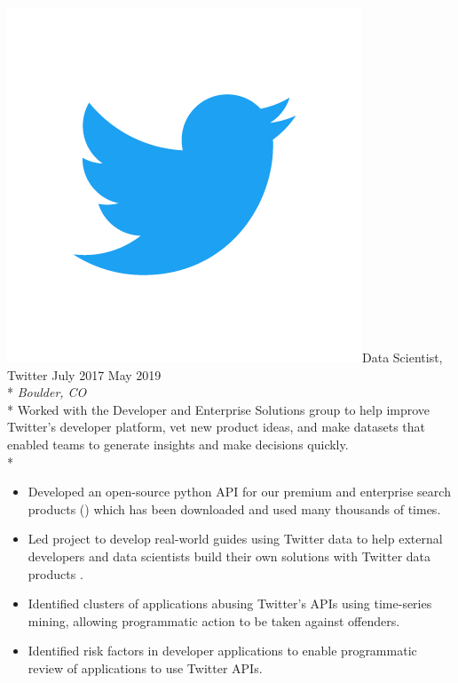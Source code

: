 \documentclass[print]{friggeri-cv} %
\newcommand{\twittericon}{\includegraphics[scale=0.05]{Twitter_Logo_Blue.png}}%
\begin{document}
\begin{description} \itemsep1pt \parskip0pt 
  \item \twittericon {\largeheaderfont Data Scientist, Twitter } \hfill
    {\smallheaderfont July 2017 \textemdash  May 2019}\\*
    {\footnotesize \emph{Boulder, CO}} \\*
    Worked with the Developer and Enterprise Solutions group to help improve
    Twitter's developer platform, vet new product ideas, and make datasets that
    enabled teams to generate insights and make decisions quickly.\\*
    \begin{itemize} \itemsep0.5pt \parskip0pt 
      \item Developed an open-source python API for our premium and enterprise search
          products (\cite{search_tweets_python}) which has been downloaded and used 
          many thousands of times.

      \item Led project to develop real-world guides using Twitter data to
      help external developers and data scientists build their own solutions
      with Twitter data products \cite{do_more_with_twtter_data}.

      \item Identified clusters of applications abusing Twitter's APIs using time-series mining, allowing
      programmatic action to be taken against offenders.

      \item Identified risk factors in developer applications to enable programmatic
            review of applications to use Twitter APIs.

    \end{itemize}
\end{description}
\end{document}
